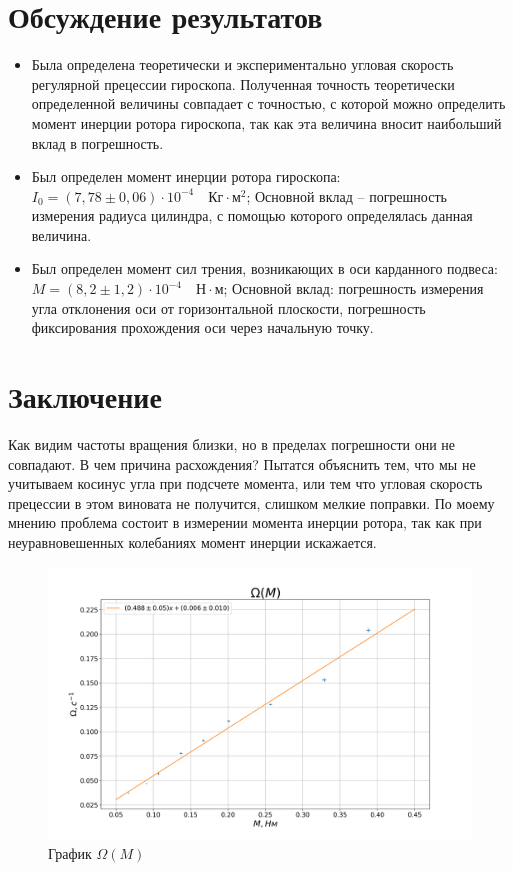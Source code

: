 \documentclass[a4paper, 12pt]{article}
\begin{document}
    \section{Обсуждение результатов}
    \begin{itemize}
			\item Была определена теоретически и экспериментально угловая скорость регулярной прецессии гироскопа. Полученная точность теоретически определенной величины совпадает с точностью, с которой можно определить момент инерции ротора гироскопа, так как эта величина вносит наибольший вклад в погрешность. 
			\item Был определен момент инерции ротора гироскопа: $I_{0} = \left( 7,78 \pm 0,06 \right) \cdot 10^{-4}\quad \text{Кг} \cdot \text{м}^{2}$; Основной вклад -- погрешность измерения радиуса цилиндра, с помощью которого определялась данная величина.
            \item Был определен момент сил трения, возникающих в оси карданного подвеса: $M = (8,2 \pm 1,2)\cdot 10^{-4}\quad \text{Н}\cdot\text{м}$;  Основной вклад: погрешность измерения угла отклонения оси от горизонтальной плоскости, погрешность фиксирования прохождения оси через начальную точку.
   \end{itemize}
    \section{Заключение}
    Как видим частоты вращения близки, но в пределах погрешности они не совпадают. В чем причина расхождения? Пытатся объяснить тем, что мы не учитываем косинус угла при подсчете момента, или тем что угловая скорость прецессии в этом виновата не получится, слишком мелкие поправки. По моему мнению проблема состоит в измерении момента инерции ротора, так как при неуравновешенных колебаниях момент инерции искажается.
    \newpage
    \begin{figure}
        \includegraphics[width=1.20\textwidth]{plot.png}
        \caption{График $\Omega(M)$}
    \end{figure}
\end{document}
